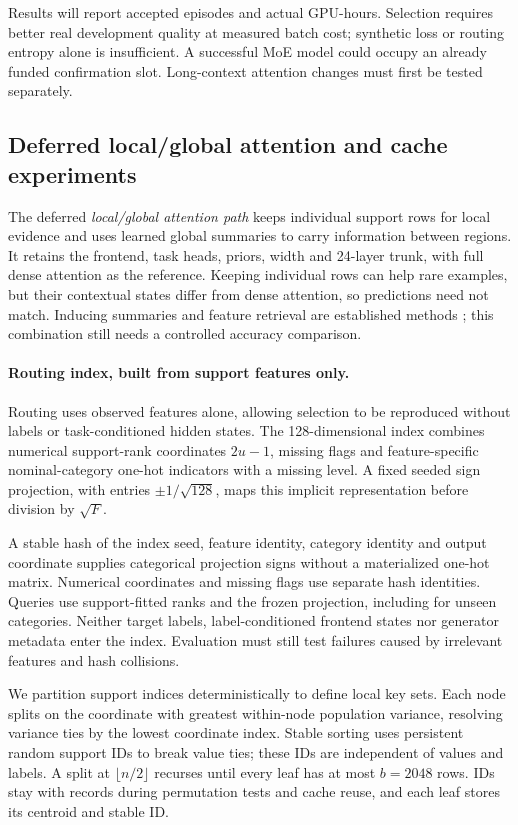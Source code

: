\documentclass[11pt]{article}
\begin{document}
Results will report accepted episodes and actual GPU-hours. Selection requires better real development quality at measured batch cost; synthetic loss or routing entropy alone is insufficient. A successful MoE model could occupy an already funded confirmation slot. Long-context attention changes must first be tested separately.

\subsection{Deferred local/global attention and cache experiments}

\label{sec:hybrid-context}

The deferred \emph{local/global attention path} keeps individual support rows for local evidence and uses learned global summaries to carry information between regions. It retains the frontend, task heads, priors, width and 24-layer trunk, with full dense attention as the reference. Keeping individual rows can help rare examples, but their contextual states differ from dense attention, so predictions need not match. Inducing summaries and feature retrieval are established methods \cite{settransformer,tabdpt}; this combination still needs a controlled accuracy comparison.

\paragraph{Routing index, built from support features only.}
Routing uses observed features alone, allowing selection to be reproduced without labels or task-conditioned hidden states. The 128-dimensional index combines numerical support-rank coordinates $2u-1$, missing flags and feature-specific nominal-category one-hot indicators with a missing level. A fixed seeded sign projection, with entries $\pm1/\sqrt{128}$, maps this implicit representation before division by $\sqrt F$.

A stable hash of the index seed, feature identity, category identity and output coordinate supplies categorical projection signs without a materialized one-hot matrix. Numerical coordinates and missing flags use separate hash identities. Queries use support-fitted ranks and the frozen projection, including for unseen categories. Neither target labels, label-conditioned frontend states nor generator metadata enter the index. Evaluation must still test failures caused by irrelevant features and hash collisions.

We partition support indices deterministically to define local key sets. Each node splits on the coordinate with greatest within-node population variance, resolving variance ties by the lowest coordinate index. Stable sorting uses persistent random support IDs to break value ties; these IDs are independent of values and labels. A split at $\lfloor n/2\rfloor$ recurses until every leaf has at most $b=2048$ rows. IDs stay with records during permutation tests and cache reuse, and each leaf stores its centroid and stable ID.
\end{document}

